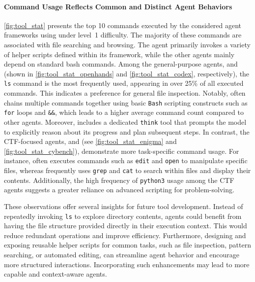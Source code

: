 \paragraph{Command Usage Reflects Common and Distinct Agent Behaviors}
\cref{fig:tool_stat} presents the top 10 commands executed by the considered agent frameworks using \gptiv under level~1 difficulty.
The majority of these commands are associated with file searching and browsing.
The agent \enigma primarily invokes a variety of helper scripts defined within its framework, while the other agents mainly depend on standard bash commands.
Among the general-purpose agents, \openhands and \codex (shown in \cref{fig:tool_stat_openhands} and \cref{fig:tool_stat_codex}, respectively), the \texttt{ls} command is the most frequently used, appearing in over 25\% of all executed commands. This indicates a preference for general file inspection.
Notably, \openhands often chains multiple commands together using basic \texttt{Bash} scripting constructs such as \texttt{for} loops and \texttt{\&\&}, which leads to a higher average command count compared to other agents.
Moreover, \openhands includes a dedicated \texttt{think} tool that prompts the model to explicitly reason about its progress and plan subsequent steps.
In contrast, the CTF-focused agents, \enigma and \cybench (see \cref{fig:tool_stat_enigma} and \cref{fig:tool_stat_cybench}), demonstrate more task-specific command usage.
For instance, \enigma often executes commands such as \texttt{edit} and \texttt{open} to manipulate specific files, whereas \cybench frequently uses \texttt{grep} and \texttt{cat} to search within files and display their contents.
Additionally, the high frequency of \texttt{python3} usage among the CTF agents suggests a greater reliance on advanced scripting for problem-solving.

These observations offer several insights for future tool development.
Instead of repeatedly invoking \texttt{ls} to explore directory contents, agents could benefit from having the file structure provided directly in their execution context.
This would reduce redundant operations and improve efficiency.
Furthermore, designing and exposing reusable helper scripts for common tasks, such as file inspection, pattern searching, or automated editing, can streamline agent behavior and encourage more structured interactions.
Incorporating such enhancements may lead to more capable and context-aware agents.


